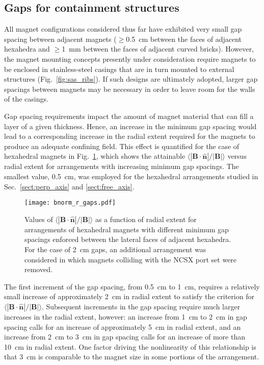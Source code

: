 \documentclass[11pt,onecolumn]{article}
\newcommand{\relbnorm}{\langle|\mathbf{B}\cdot\hat{\mathbf{n}}|
                       /|\mathbf{B}|\rangle}
\begin{document}
\subsection{Gaps for containment structures}
\label{ssect:gaps}

All magnet configurations considered thus far have exhibited very small gap
spacing between adjacent magnets ($\geq$0.5~cm between the faces of adjacent
hexahedra and $\geq$1~mm between the faces of adjacent curved bricks).
However, the magnet mounting concepts presently under consideration require
magnets to be enclosed in stainless-steel casings that are
in turn mounted to external structures (Fig.~\ref{fig:sas_ribs}). 
If such designs are ultimately 
adopted, larger gap spacings between magnets may be necessary in order
to leave room for the walls of the casings.

Gap spacing requirements impact the amount of magnet material that can fill
a layer of a given thickness. Hence, an increase in the minimum gap
spacing would lead to a corresponding increase in the radial extent required
for the magnets to produce an adequate confining field. This effect is 
quantified for the case of hexahedral magnets in Fig.~\ref{fig:bnorm_r_gaps},
which shows the attainable $\relbnorm$ versus radial extent for arrangements
with increasing minimum gap spacings. The smallest value, 0.5~cm, was employed 
for the hexahedral arrangements studied in Sec.~\ref{sect:perp_axis} and 
\ref{sect:free_axis}. 

\begin{figure}
    \begin{center}
    \texttt{[image: bnorm\_r\_gaps.pdf]}
    \caption{Values of $\relbnorm$ as a function of radial extent for 
             arrangements of hexahedral magnets with different minimum 
             gap spacings enforced between the lateral faces of adjacent
             hexahedra. For the case of 2~cm gaps, an additional arrangement
             was considered in which magnets colliding with the NCSX port set
             were removed.}
    \label{fig:bnorm_r_gaps}
    \end{center}
\end{figure}

The first increment of the gap spacing, from 0.5~cm to 1~cm, 
requires a relatively small increase of approximately 2~cm in radial 
extent to satisfy the criterion for $\relbnorm$. Subsequent increments in the
gap spacing require much larger increases in the radial extent, however:
an increase from 1~cm to 2~cm in gap spacing calls for an increase of 
approximately 5~cm in radial extent, and an increase from 2~cm to 3~cm in
gap spacing calls for an increase of more than 10~cm in radial extent. One 
factor driving the nonlinearity of this relationship is that 3~cm is comparable 
to the magnet size in some portions of the arrangement.
\end{document}
